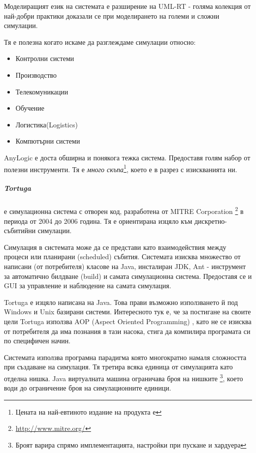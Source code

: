 			Моделиращият език на системата е разширение на UML-RT - голяма колекция от най-добри практики
			доказали се при моделирането на големи и сложни симулации.
						
			Тя е полезна когато искаме да разглеждаме симулации относно:
			
			\begin{itemize}
				\item Контролни системи
				\item Производство
				\item Телекомуникации
				\item Обучение
				\item Логистика(Logistics)
				\item Компютърни системи
			\end{itemize}			
			
			AnyLogic е доста обширна и понякога тежка система. Предоставя голям набор от полезни инструменти.
			Тя е \emph{много скъпа}\footnote{Цената на най-евтиното издание на продукта е }, 
			което е в разрез с изискванията ни. \cite{AnyLogic}
			
		\subparagraph{Tortuga} е симулационна система с отворен код, разработена от MITRE Corporation
			\footnote{\url{http://www.mitre.org/}} в периода от 2004 до 2006 година.
			Тя е ориентирана изцяло към дискретно-събитийни симулации.
			
			Симулация в системата може да се представи като взаимодействия между процеси или планирани (scheduled) събития.
			Системата изисква множество от написани (от потребителя) класове на Java, инсталиран \ac{JDK}, 
			Ant - инструмент за автоматично билдване (build) и самата симулационна система. 
			Предоставя се и \ac{GUI} за управление и наблюдение на самата симулация.
					
			Tortuga е изцяло написана на Java. Това прави възможно използването й под Windows и Unix базирани системи.
			Интересното тук е, че за постигане на своите цели Tortuga използва AOP (Aspect Oriented Programming)
			\cite{AOP}, като не се изисква от потребителя да има познания в тази насока, стига да компилира 
			програмата си по специфичен начин. 			
		
			Системата използва програмна парадигма която многократно намаля сложността при създаване на симулация.
			Тя третира всяка единица от симулацията като отделна нишка. Java виртуалната машина ограничава броя на нишките
			\footnote{Броят варира спрямо имплементацията, настройки при пускане и хардуера}, 
			което води до ограничение броя на симулационните единици.
		
